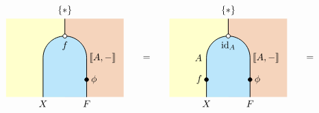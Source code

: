 \[
    \begin{tikzpicture}[x=0.8cm,y=0.8cm, line width=0.7pt, hollow/.style={
            circle,
            fill=white,
            draw,
            outer sep=0pt,
            inner sep=1.5pt,
            line width=0.7pt
          }]
         \definecolor{leftcolor}{RGB}{255,255,204}
    \definecolor{midcolor}{HTML}{BBE6FB}
    \definecolor{rightcolor}{HTML}{F5D4BC}

    \node at (-3.75, 1.8) {$=$};
    \node at (3.75, 1.8) {$=$};

    \begin{scope}[shift={(-7.5,0)}]
        \begin{scope} 
            \clip (-2.7,0) rectangle (2.7, 3.6);     
            \fill[fill=leftcolor] (-3,0) rectangle (0, 4);  
            \fill[fill=rightcolor] (0,0) rectangle (3, 4);  
            \draw[fill=midcolor, rounded corners=0.8cm, line width=0.7pt] (-1, -2) rectangle (1, 2.8);
        \end{scope}
        \draw (0, 3.6) -- (0,2.8);
        \filldraw [black] (1,0.8) circle (2pt) node[right=1pt] {$\phi$};
        \node[below] at (-1, 0) {$X$};
        \node[right=-1pt] at (1, 1.8) {$\llbracket A , -\rrbracket$};
        \node[below] at (1, 0) {$F$};
        \node[hollow] at (0, 2.8) {};
        \node[below=2pt] at (0, 2.8) {$f$}; 
        \node[above] at (0, 3.6) {$\{*\}$};
    \end{scope}

    \begin{scope}[shift={(0,0)}]
        \begin{scope} 
            \clip (-2.7,0) rectangle (2.7, 3.6);     
            \fill[fill=leftcolor] (-3,0) rectangle (0, 4);  
            \fill[fill=rightcolor] (0,0) rectangle (3, 4);  
            \draw[fill=midcolor, rounded corners=0.8cm, line width=0.7pt] (-1, -2) rectangle (1, 2.8);
        \end{scope}
        \draw (0, 3.6) -- (0,2.8);
        \filldraw [black] (1,0.8) circle (2pt) node[right=1pt] {$\phi$};
        \filldraw [black] (-1,0.8) circle (2pt) node[left=1pt] {$f$};
        \node[below] at (-1, 0) {$X$};
        \node[right=-1pt] at (1, 1.8) {$\llbracket A , -\rrbracket$};
        \node[left=1pt] at (-1, 1.8) {$A$};
        \node[below] at (1, 0) {$F$};
        \node[hollow] at (0, 2.8) {};
        \node[below=2pt] at (0, 2.8) {$\mathrm{id}_A$}; 
        \node[above] at (0, 3.6) {$\{*\}$};
    \end{scope}


\end{tikzpicture}\]
